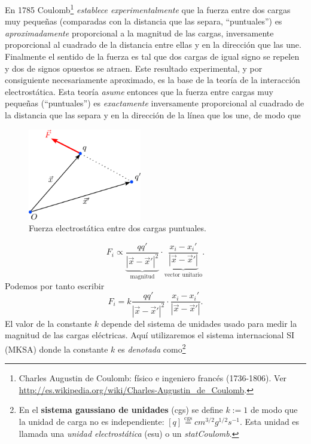 En 1785 Coulomb\footnote{Charles Augustin de Coulomb: físico e ingeniero francés (1736-1806). Ver \url{http://es.wikipedia.org/wiki/Charles-Augustin_de_Coulomb}.} \textit{establece experimentalmente} que la fuerza entre dos cargas muy peque\~nas (comparadas con la distancia que las separa, ``puntuales'') es \textit{aproximadamente}  proporcional a la magnitud de las cargas, inversamente proporcional al cuadrado de la distancia entre ellas y en la dirección que las
une. Finalmente el sentido de la fuerza es tal que dos cargas de igual signo se repelen y dos de signos opuestos se atraen. Este resultado experimental, y por consiguiente necesariamente aproximado, es la base de la teoría de la interacción electrostática. Esta teoría \textit{asume} entonces que la fuerza entre cargas muy pequeñas (``puntuales'') es \textit{exactamente} inversamente proporcional al cuadrado de la distancia que las separa y en la dirección de la línea que los une, de modo que
\begin{center}
\begin{figure}[H]
\centerline{\includegraphics[height=4cm]{fig/fig-Coulomb.pdf}}
\caption{Fuerza electrostática entre dos cargas puntuales.}
\label{fig:Coulomb}
\end{figure}
\end{center}
\begin{equation}
F_i\propto \underbrace{\frac{qq'}{\left\vert \vec x-\vec
x'\right\vert^2}}_\text{magnitud}\cdot
\underbrace{\frac{x_i-x_i'}{\left\vert \vec x-\vec x'\right\vert }}_\text{vector unitario}.
\end{equation}
Podemos por tanto escribir
\begin{equation}
F_i=k\frac{qq'}{\left\vert \vec x-\vec x'\right\vert^2}
\cdot\frac{x_i-x_i'}{\left\vert \vec x-\vec x'\right\vert }.
\end{equation}
El valor de la constante $k$ depende del sistema de unidades usado para medir la magnitud de las cargas eléctricas. Aquí utilizaremos el sistema internacional SI (MKSA) donde la constante $k$ es \textit{denotada} como\footnote{En el \textbf{sistema gaussiano de unidades} (cgs) se define $k:=1$ de modo que la unidad de carga no es independiente: $[q]\stackrel{\text{cgs}}{=}cm^{3/2}g^{1/2}s^{-1}$. Esta unidad es llamada una \textit{unidad electrostática} (esu) o un \textit{statCoulomb}.}%

